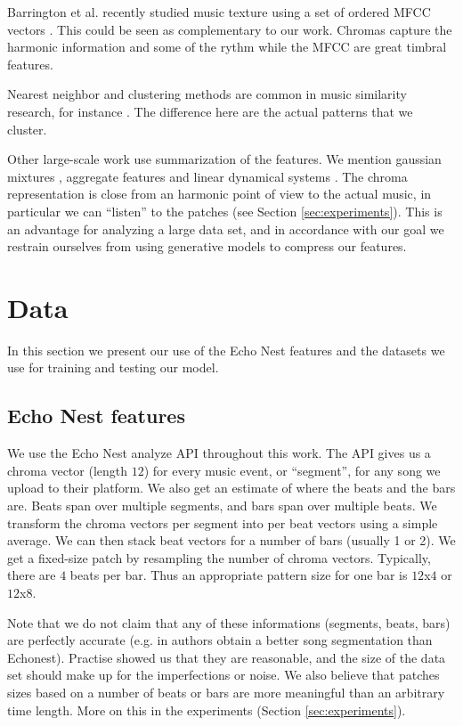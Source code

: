 \documentclass{article}
\begin{document}
Barrington et al. recently studied music texture using a set of ordered
MFCC vectors \cite{Barrington2009a}. This could be seen as complementary
to our work. Chromas capture the harmonic information and some of the
rythm while the MFCC are great timbral features.

Nearest neighbor and clustering methods are common in music similarity 
research, for instance \cite{Cano2004,Holzapfel2009}. The difference here 
are the actual patterns that we cluster.

Other large-scale work use summarization of the features. We mention 
gaussian mixtures \cite{Mandel2005}, aggregate features \cite{Bergstra2006a}
and linear dynamical systems \cite{Barrington2009a}. The chroma representation
is close from an harmonic point of view to the actual music, in particular
we can ``listen'' to the patches (see Section \ref{sec:experiments}).
This is an advantage for analyzing a large data set, and in accordance with our goal
we restrain ourselves from using generative models to compress our features.


\section{Data}\label{sec:data}
In this section we present our use of the Echo Nest features and the
datasets we use for training and testing our model.


\subsection{Echo Nest features}
We use the Echo Nest analyze API \cite{EchoNest} throughout this work.
The API gives us a chroma vector (length $12$) for every music event, 
or ``segment'', for any song we upload to their platform. 
We also get an estimate of where the beats and the bars are. Beats span over
multiple segments, and bars span over multiple beats. 
We transform the chroma vectors per segment into per beat vectors using a 
simple average. We can then stack beat vectors for a number of bars 
(usually 1 or 2). 
We get a fixed-size patch by resampling the number of chroma vectors. Typically,
there are $4$ beats per bar. Thus an appropriate pattern size for one bar
is $12$x$4$ or $12$x$8$.

Note that we do not claim that any of these informations (segments, beats, bars)
are perfectly accurate (e.g. in \cite{Barrington2009a} authors obtain a better
song segmentation than Echonest). Practise showed us that they are reasonable, 
and the size of the data set should make up for the imperfections or noise.
We also believe that patches sizes based on a number of beats or bars are more
meaningful than an arbitrary time length. More on this in the experiments
(Section \ref{sec:experiments}).
\end{document}
